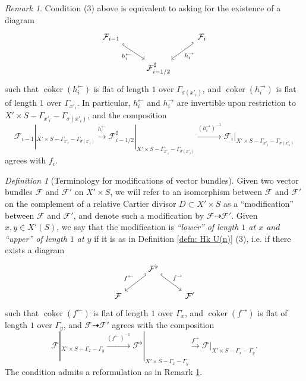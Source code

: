 \documentclass[reqno]{amsart}
\numberwithin{equation}{section}
\newcommand{\Cal}[1]{\mathcal{#1}}
\DeclareMathOperator{\coker}{coker}
\theoremstyle{remark}
\newtheorem{remark}[thm]{Remark}
\newtheorem{defn}[thm]{Definition}
\numberwithin{equation}{section}
\begin{document}
\begin{remark}\label{rem: formulation of upper/lower}
Condition (3) above is equivalent to asking for the existence of a diagram 
\[
\begin{tikzcd}
\Cal{F}_{i-1}  \ar[dr, "h_i^{\leftarrow}"', hook] & & \Cal{F}_i  \ar[dl, "h_i^{\rightarrow}", hook']  \\
& \Cal{F}_{i-1/2}^{\sharp} 
\end{tikzcd}
\]
such that $\coker(h_i^{\leftarrow})$ is flat of length $1$ over $\Gamma_{\sigma(x'_i)}$, and $\coker(h_i^{\rightarrow})$ is flat of length $1$ over $\Gamma_{x'_i}$. In particular, $h_i^{\leftarrow}$ and $h_i^{\rightarrow}$ are invertible upon restriction to $X' \times S - \Gamma_{x'_i}-\Gamma_{\sigma(x'_i)}$, and the composition 
\[
\Cal{F}_{i-1}|_{X' \times S - \Gamma_{x'_i}-\Gamma_{\sigma(x'_i)}} \xrightarrow{h_i^{\leftarrow}} \Cal{F}_{i-1/2}^{\sharp}|_{X' \times S - \Gamma_{x'_i}-\Gamma_{\sigma(x'_i)}} \xrightarrow{(h_i^{\rightarrow})^{-1}} \Cal{F}_{i} |_{X' \times S - \Gamma_{x'_i}-\Gamma_{\sigma(x'_i)}} 
\]
agrees with $f_i$. 
\end{remark}


\begin{defn}[Terminology for modifications of vector bundles]
Given two vector bundles $\Cal{F}$ and $\Cal{F}'$ on $X' \times S$, we will refer to an isomorphism between $\Cal{F}$ and $\Cal{F}'$ on the complement of a relative Cartier divisor $D\subset X'\times S$ %
as a ``modification'' between $\Cal{F}$ and $\Cal{F}'$, and denote such a modification by $\Cal{F} \dashrightarrow \Cal{F}'$. Given $x,y \in X'(S)$, we say that the modification is \emph{``lower'' of length $1$ at $x$ and ``upper'' of length $1$ at $y$} if it is as in Definition \ref{defn: Hk U(n)} (3), i.e. if there exists a diagram 
\begin{equation}
\begin{tikzcd}
&\Cal{F}^{\flat} \ar[dl, "f^{\leftarrow}"', hook']  \ar[dr, "f^{\rightarrow}", hook ]  &  \\
\Cal{F} & & \Cal{F}'
\end{tikzcd}
\end{equation}
such that $\coker(f^{\leftarrow})$ is flat of length $1$ over $\Gamma_{x}$, and $\coker(f^{\rightarrow})$ is flat of length $1$ over $\Gamma_{y}$, and $\Cal{F} \dashrightarrow \Cal{F}'$ agrees with the composition 
\[
\Cal{F}|_{X' \times S - \Gamma_{x}-\Gamma_{y}} \xrightarrow{(f^{\leftarrow})^{-1}} \Cal{F}^{\flat}|_{X' \times S - \Gamma_x-\Gamma_y} \xrightarrow{f^{\rightarrow}} \Cal{F} |_{X' \times S - \Gamma_x-\Gamma_y} .
\]
The condition admits a reformulation as in Remark \ref{rem: formulation of upper/lower}.
\end{defn}
\end{document}
